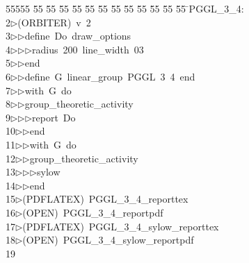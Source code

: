 %
%
\begin{tabbing}
55555 \= 55 \= 55 \= 55 \= 55 \= 55 \= 55 \= 55 \= 55 \= 55 \= 55 \= 55 \= 55 \= \>PGGL\_3\_4:\\[0pt]
2\>$\triangleright$\>(ORBITER)\ v\ 2\ \\[0pt]
3\>$\triangleright$\>$\triangleright$\>define\ Do\ draw\_options\ \\[0pt]
4\>$\triangleright$\>$\triangleright$\>$\triangleright$\>radius\ 200\ line\_width\ 03\ \\[0pt]
5\>$\triangleright$\>$\triangleright$\>end\ \\[0pt]
6\>$\triangleright$\>$\triangleright$\>define\ G\ linear\_group\ PGGL\ 3\ 4\ end\ \\[0pt]
7\>$\triangleright$\>$\triangleright$\>with\ G\ do\ \\[0pt]
8\>$\triangleright$\>$\triangleright$\>group\_theoretic\_activity\ \\[0pt]
9\>$\triangleright$\>$\triangleright$\>$\triangleright$\>report\ Do\ \\[0pt]
10\>$\triangleright$\>$\triangleright$\>end\ \\[0pt]
11\>$\triangleright$\>$\triangleright$\>with\ G\ do\ \\[0pt]
12\>$\triangleright$\>$\triangleright$\>group\_theoretic\_activity\ \\[0pt]
13\>$\triangleright$\>$\triangleright$\>$\triangleright$\>sylow\ \\[0pt]
14\>$\triangleright$\>$\triangleright$\>end\\[0pt]
15\>$\triangleright$\>(PDFLATEX)\ PGGL\_3\_4\_reporttex\\[0pt]
16\>$\triangleright$\>(OPEN)\ PGGL\_3\_4\_reportpdf\\[0pt]
17\>$\triangleright$\>(PDFLATEX)\ PGGL\_3\_4\_sylow\_reporttex\\[0pt]
18\>$\triangleright$\>(OPEN)\ PGGL\_3\_4\_sylow\_reportpdf\\[0pt]
19\>\end{tabbing}
